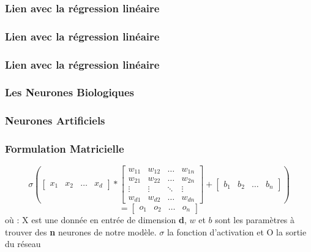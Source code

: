 \begin{frame}
  \frametitle{Lien avec la régression linéaire}
\end{frame}

\begin{frame}
  \frametitle{Lien avec la régression linéaire}
\end{frame}

\begin{frame}
  \frametitle{Lien avec la régression linéaire}
\end{frame}

\begin{frame}
  \frametitle{Les Neurones Biologiques}
\end{frame}

\begin{frame}
  \frametitle{Neurones Artificiels}
\end{frame}

\begin{frame}
  \frametitle{Formulation Matricielle}
  \[
  \sigma \left(
  \begin{bmatrix}
    x_{1} & x_{2} & \dots & x_{d}
  \end{bmatrix}
  *
  \begin{bmatrix}
    w_{11} & w_{12} & \dots  & w_{1n} \\
    w_{21} & w_{22} & \dots  & w_{2n} \\
    \vdots & \vdots & \ddots & \vdots \\
    w_{d1} & w_{d2} & \dots  & w_{dn}
  \end{bmatrix}
  +
  \begin{bmatrix}
    b_{1} & b_{2} & \dots & b_{n}
  \end{bmatrix}
  \right )
  \]
  \[
  =
  \begin{bmatrix}
    o_{1} & o_{2} & \dots & o_{n}
  \end{bmatrix}
  \]
  \newline
  où :
  \newline
  X est une donnée en entrée de dimension \textbf{d},
  \newline
  $w$ et $b$ sont les paramètres à trouver des \textbf{n} neurones de notre modèle.
  \newline
  $\sigma$ la fonction d'activation et
  \newline
  O la sortie du réseau
\end{frame}

